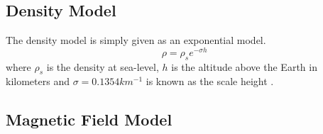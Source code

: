 \subsection{Density Model}

The density model is simply given as an exponential model. 
\begin{equation}
     \rho = \rho_s e^{-\sigma h}
\end{equation}
where $\rho_s$ is the density at sea-level, $h$ is the altitude above
the Earth in kilometers and $\sigma = 0.1354 km^{-1}$ is known as the
scale height \cite{Jacchia1,Jacchia2,Jacchia3}.  

\subsection{Magnetic Field Model}\label{s:magnetic_field}

